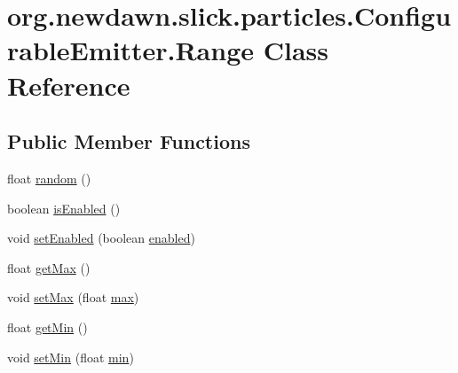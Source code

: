 \hypertarget{classorg_1_1newdawn_1_1slick_1_1particles_1_1_configurable_emitter_1_1_range}{}\section{org.\+newdawn.\+slick.\+particles.\+Configurable\+Emitter.\+Range Class Reference}
\label{classorg_1_1newdawn_1_1slick_1_1particles_1_1_configurable_emitter_1_1_range}
\subsection*{Public Member Functions}
\begin{DoxyCompactItemize}
\item 
float \mbox{\hyperlink{classorg_1_1newdawn_1_1slick_1_1particles_1_1_configurable_emitter_1_1_range_adc19242ab1467fd1a8578eebbc09b416}{random}} ()
\item 
boolean \mbox{\hyperlink{classorg_1_1newdawn_1_1slick_1_1particles_1_1_configurable_emitter_1_1_range_a79064f67a7ec003d21a7bf3cf9a8794d}{is\+Enabled}} ()
\item 
void \mbox{\hyperlink{classorg_1_1newdawn_1_1slick_1_1particles_1_1_configurable_emitter_1_1_range_a29a67c672c6a5d4452aff4d71a5286d9}{set\+Enabled}} (boolean \mbox{\hyperlink{classorg_1_1newdawn_1_1slick_1_1particles_1_1_configurable_emitter_1_1_range_a8e14b5a19b817ff49fb52b9d3dd303ce}{enabled}})
\item 
float \mbox{\hyperlink{classorg_1_1newdawn_1_1slick_1_1particles_1_1_configurable_emitter_1_1_range_ae716224b766ab80d7008f6ce899277a7}{get\+Max}} ()
\item 
void \mbox{\hyperlink{classorg_1_1newdawn_1_1slick_1_1particles_1_1_configurable_emitter_1_1_range_a4951a74e98d5a055803ebc59d269c472}{set\+Max}} (float \mbox{\hyperlink{classorg_1_1newdawn_1_1slick_1_1particles_1_1_configurable_emitter_1_1_range_a6950c49934d7424d5ab449b3b3256ec0}{max}})
\item 
float \mbox{\hyperlink{classorg_1_1newdawn_1_1slick_1_1particles_1_1_configurable_emitter_1_1_range_a5f213f872614c3cef6b8ae29a030def4}{get\+Min}} ()
\item 
void \mbox{\hyperlink{classorg_1_1newdawn_1_1slick_1_1particles_1_1_configurable_emitter_1_1_range_a9415104a8d734475c997be2f23e34eb5}{set\+Min}} (float \mbox{\hyperlink{classorg_1_1newdawn_1_1slick_1_1particles_1_1_configurable_emitter_1_1_range_a863382f93996d8d07cea741bea1fb9a9}{min}})
\end{DoxyCompactItemize}
